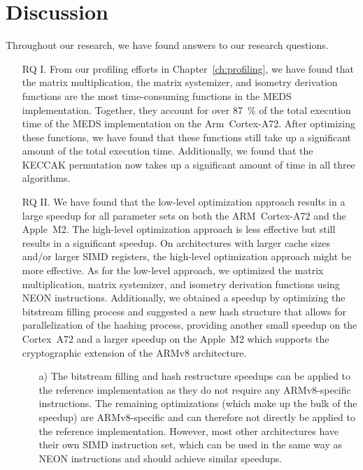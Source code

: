 \documentclass[11pt,a4paper]{report}
\theoremstyle{definition}
\begin{document}
\section{Discussion}
Throughout our research, we have found answers to our research questions.
\begin{itemize}[left=35pt,labelsep=15pt]
  \item[RQ I.] From our profiling efforts in Chapter~\ref{ch:profiling}, we have found that the matrix multiplication, the matrix systemizer, and isometry derivation functions are the most time-consuming functions in the MEDS implementation. Together, they account for over 87~\% of the total execution time of the MEDS implementation on the Arm~Cortex-A72. After optimizing these functions, we have found that these functions still take up a significant amount of the total execution time. Additionally, we found that the KECCAK permutation now takes up a significant amount of time in all three algorithms.
  \item[RQ II.] We have found that the low-level optimization approach results in a large speedup for all parameter sets on both the ARM~Cortex-A72 and the Apple~M2. The high-level optimization approach is less effective but still results in a significant speedup. On architectures with larger cache sizes and/or larger SIMD registers, the high-level optimization approach might be more effective. As for the low-level approach, we optimized the matrix multiplication, matrix systemizer, and isometry derivation functions using NEON instructions. Additionally, we obtained a speedup by optimizing the bitstream filling process and suggested a new hash structure that allows for parallelization of the hashing process, providing another small speedup on the Cortex~A72 and a larger speedup on the Apple~M2 which supports the cryptographic extension of the ARMv8 architecture.
        \begin{itemize}
          \item[a)] The bitstream filling and hash restructure speedups can be applied to the reference implementation as they do not require any ARMv8-specific instructions. The remaining optimizations (which make up the bulk of the speedup) are ARMv8-specific and can therefore not directly be applied to the reference implementation. However, most other architectures have their own SIMD instruction set, which can be used in the same way as NEON instructions and should achieve similar speedups.
        \end{itemize}
\end{itemize}
\end{document}
